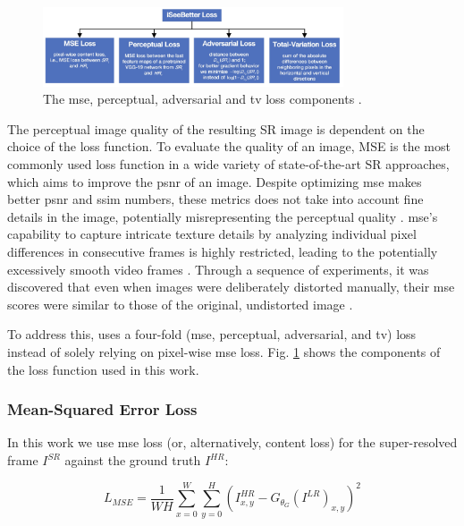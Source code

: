 \documentclass[conference]{IEEEtran}
\begin{document}
\begin{figure}[!htb]
	\centering
    \centerline{\includegraphics[width=8.9cm]{loss}}
	\caption{The \acrshort{mse}, perceptual, adversarial and \acrshort{tv} loss components \cite{iSeeBetter_2020}.}
	\label{fig:loss}
\end{figure}

The perceptual image quality of the resulting SR image is dependent on the choice of the loss function. To evaluate the quality of an image, MSE is the most commonly used loss function in a wide variety of state-of-the-art SR approaches, which aims to improve the \acrshort{psnr} of an image. Despite optimizing \acrshort{mse} makes better \acrshort{psnr} and \acrshort{ssim} numbers, these metrics does not take into account fine details in the image, potentially misrepresenting the perceptual quality \cite{iSeeBetter_2020}. \acrshort{mse}'s capability to capture intricate texture details by analyzing individual pixel differences in consecutive frames is highly restricted, leading to the potentially excessively smooth video frames \cite{fast_video_super_reso_ann_2012}. Through a sequence of experiments, it was discovered that even when images were deliberately distorted manually, their \acrshort{mse} scores were similar to those of the original, undistorted image \cite{universal_image_quality_index_2002}.

To address this, \cite{iSeeBetter_2020} uses a four-fold (\acrlong{mse}, perceptual, adversarial, and \acrlong{tv}) loss instead of solely relying on pixel-wise \acrshort{mse} loss. Fig. \ref{fig:loss} shows the components of the loss function used in this work.

\subsubsection{Mean-Squared Error Loss}

In this work we use \acrshort{mse} loss (or, alternatively, content loss) for the super-resolved frame $I^{SR}$ against the ground truth $I^{HR}$:

\begin{equation} \label{eq:mse_loss}
	L_{MSE} = \frac{1}{WH} \sum_{x=0}^{W} \sum_{y=0}^{H} ( I^{HR}_{x,y} - G_{\theta_G} (I^{LR})_{x,y} )^2
\end{equation}
\end{document}
